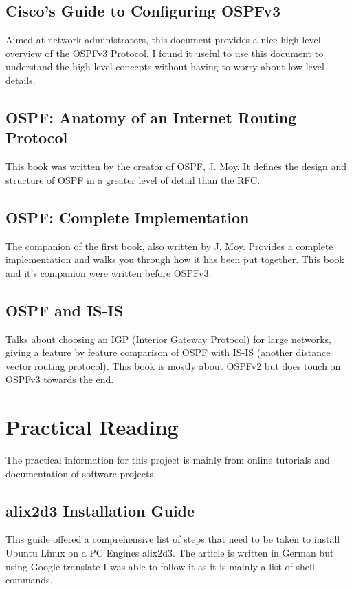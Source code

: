 \documentclass[12pt]{report}
\begin{document}
\subsection{Cisco's Guide to Configuring OSPFv3}
Aimed at network administrators, this document provides a nice high level
overview of the OSPFv3 Protocol. I found it useful to use this document to
understand the high level concepts without having to worry about low level
details.

\subsection{OSPF: Anatomy of an Internet Routing Protocol}
This book was written by the creator of OSPF, J. Moy. It defines the design and
structure of OSPF in a greater level of detail than the RFC.

\subsection{OSPF: Complete Implementation}
The companion of the first book, also written by J. Moy. Provides a complete
implementation and walks you through how it has been put together. This book and
it's companion were written before OSPFv3.

\subsection{OSPF and IS-IS}
Talks about choosing an IGP (Interior Gateway Protocol)
 for large networks, giving a
feature by feature comparison of OSPF with IS-IS
(another
distance vector routing protocol). This book is mostly about OSPFv2 but does
touch on OSPFv3 towards the end.

\section{Practical Reading}		
The practical information for this project is mainly from online tutorials and
documentation of software projects.  

\subsection{alix2d3 Installation Guide}
This guide offered a comprehensive list of steps that need to be taken to
install Ubuntu Linux on a PC Engines alix2d3.  The article is written in
German but using Google translate I was able to follow it as it is mainly a list
of shell commands.
\end{document}
